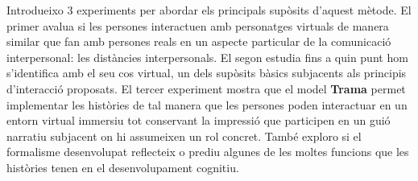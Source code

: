 \documentclass[11pt,a4paper,pdftex,headexclude,smallheadings,pointlessnumbers,bibtotoc,idxtotoc,twoside,authordate1-4]{report}
\begin{document}
Introdueixo 3 experiments per abordar els principals supòsits d'aquest mètode. El primer avalua si  les persones interactuen amb personatges virtuals de manera similar que fan amb persones reals en un aspecte particular de la comunicació interpersonal: les distàncies interpersonals. El segon estudia fins a quin punt hom s'identifica amb el seu cos virtual, un dels supòsits bàsics subjacents als principis d'interacció proposats.
El tercer experiment mostra que el model \textbf{Trama} permet implementar les històries de tal manera que les persones poden interactuar en un entorn virtual immersiu tot conservant la impressió que participen en un guió narratiu subjacent on hi assumeixen un rol concret.
També exploro si el formalisme desenvolupat reflecteix o prediu algunes de les moltes funcions que les històries tenen en el desenvolupament cognitiu.

\clearpage







\end{document}

